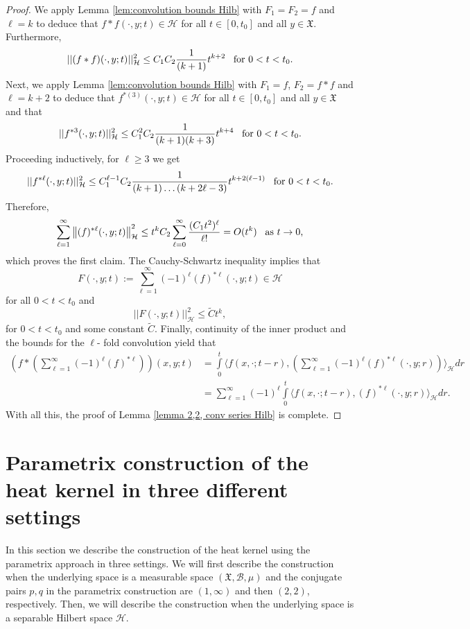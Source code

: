 \documentclass[11pt,reqno]{amsart}
\theoremstyle{remark}
\theoremstyle{definition}
\numberwithin{theorem}{section} \numberwithin{equation}{section}
\newcommand{\X}{\mathfrak{X}}
\begin{document}
\begin{proof}
We apply Lemma \ref{lem:convolution bounds Hilb}
with $F_1=F_2=f$ and $\ell =k $ to deduce that $f\ast f(\cdot, y;t) \in \mathcal{H}$ for all $t\in[0,t_0]$ and all $y\in\X$.
Furthermore,
$$
||(f\ast f)(\cdot,y;t)||_{\mathcal{H}}^2 \leq C_{1}C_{2}\frac{1}{(k+1)}
  t^{k+2}
  \,\,\,\,\,
  \text{\rm for $0<t<t_{0}$.}
$$
Next, we apply Lemma \ref{lem:convolution bounds Hilb}
with $F_1=f$, $F_2=f\ast f$ and $\ell =k+2 $ to deduce that $ f^{\ast (3)}(\cdot, y;t) \in \mathcal{H}$ for all $t\in[0,t_0]$ and all $y\in\X$ and that
$$
|| f^{\ast 3}(\cdot,y;t)||_{\mathcal{H}}^2 \leq C_{1}^2 C_{2}\frac{1}{(k+1)(k+3)}
  t^{k+4}
  \,\,\,\,\,
  \text{\rm for $0<t<t_{0}$.}
$$
Proceeding inductively, for $\ell\geq 3$ we get
$$
|| f^{\ast \ell}(\cdot,y;t)||_{\mathcal{H}}^2 \leq C_{1}^{\ell-1} C_{2}\frac{1}{(k+1)\ldots (k+2\ell-3)}
  t^{k+2(\ell -1)}
  \,\,\,\,\,
  \text{\rm for $0<t<t_{0}$.}
$$
Therefore,
$$
\sum_{\ell=1}^{\infty}\left\|(f)^{\ast\ell}(\cdot,y;t)\right\|_{\mathcal{H}}^2\leq t^k C_2 \sum_{\ell=0}^{\infty}\frac{(C_1t^2)^{\ell}}{\ell!}=O(t^{k})
\,\,\,\,\,
\text{\rm as $t\to 0$,}
$$
which proves the first claim. The Cauchy-Schwartz inequality implies that
$$
F(\cdot, y;t):=\sum_{\ell=1}^{\infty}(-1)^{\ell}(f)^{\ast\ell}(\cdot, y;t)\in\mathcal{H}
$$
for all $0<t<t_{0}$ and
$$
|| F(\cdot, y;t)||_{\mathcal{H}}^2 \leq \widetilde{C} t^k,
$$
for $0<t<t_0$ and some constant $\widetilde C$.
Finally, continuity of the inner product and the bounds for the $\ell$- fold convolution yield that
   \begin{align*}\label{eq. conv intergcange int sum2}
\left(f\ast\left(\sum_{\ell=1}^{\infty}(-1)^{\ell}(f)^{\ast\ell}\right)\right)(x,y;t)&= \int\limits_0^t \langle f(x,\cdot;t-r), \left( \sum_{\ell=1}^{\infty} (-1)^\ell (f)^{\ast \ell}(\cdot,y;r)\right) \rangle_{\mathcal{H}}   dr\\&= \sum_{\ell=1}^{\infty} (-1)^\ell \int\limits_0^t \langle f(x,\cdot;t-r),(f)^{\ast \ell}(\cdot,y;r)\rangle_{\mathcal{H}}dr.
\end{align*}
With all this, the proof of Lemma \ref{lemma 2,2, conv series Hilb} is complete.
\end{proof}

\section{Parametrix construction of the heat kernel in three different settings}\label{sec. param. constr}

In this section we describe the construction of the heat kernel using the parametrix approach in three settings. We will first describe the construction
when the underlying space is a measurable space $(\X,\mathcal{B},\mu)$ and the conjugate pairs $p,q$ in the parametrix construction are
$(1,\infty)$ and then $(2,2)$, respectively. Then, we will describe the construction when the underlying space is a separable
Hilbert space $\mathcal{H}$.
\end{document}
